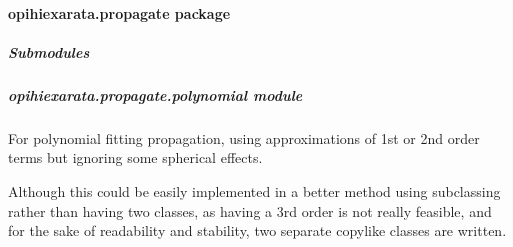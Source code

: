\documentclass[letterpaper,11pt,english]{sphinxmanual}
\begin{document}
\paragraph{opihiexarata.propagate package}
\label{\detokenize{code/opihiexarata.propagate:opihiexarata-propagate-package}}\label{\detokenize{code/opihiexarata.propagate::doc}}

\subparagraph{Submodules}
\label{\detokenize{code/opihiexarata.propagate:submodules}}
\sphinxstepscope


\subparagraph{opihiexarata.propagate.polynomial module}
\label{\detokenize{code/opihiexarata.propagate.polynomial:module-opihiexarata.propagate.polynomial}}\label{\detokenize{code/opihiexarata.propagate.polynomial:opihiexarata-propagate-polynomial-module}}\label{\detokenize{code/opihiexarata.propagate.polynomial::doc}}
\sphinxAtStartPar
For polynomial fitting propagation, using approximations of 1st or 2nd order
terms but ignoring some spherical effects.

\sphinxAtStartPar
Although this could be easily implemented in a better method using subclassing
rather than having two classes, as having a 3rd order is not really feasible,
and for the sake of readability and stability, two separate copy\sphinxhyphen{}like classes
are written.
\end{document}
